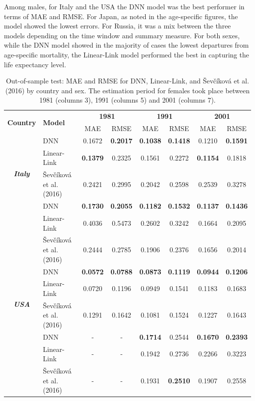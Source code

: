 \documentclass[a4,11pt]{article}
\begin{document}
Among males, for Italy and the USA the DNN model was the best performer in terms of MAE and RMSE. For Japan, as noted in the age-specific figures, the \citet{Sevcikova} model showed the lowest errors. For Russia, it was a mix between the three models depending on the time window and summary measure. For both sexes, while the DNN model showed in the majority of cases the lowest departures from age-specific mortality, the Linear-Link model performed the best in capturing the life expectancy level.


\begin{table}[H]
		\centering
		\caption{Out-of-sample test: MAE and RMSE for DNN, Linear-Link, and \v{S}ev\v{c}\'{i}kov\'{a} et al. (2016) by country and sex. The estimation period for females took place between 1981 (columns 3), 1991 (columns 5) and 2001 (columns 7).}
		\label{tab:1}
			\footnotesize	
		\begin{tabular}{cl|cc|cc|cc}
			\hline 		
			\multirow{2}{*}{\textbf{Country}} & \multirow{2}{*}{\textbf{Model}} & \multicolumn{2}{c|}{\textbf{1981\textendash 1995}} & \multicolumn{2}{c|}{\textbf{1991\textendash 2005}} & \multicolumn{2}{c}{\textbf{2001\textendash 2015}}\tabularnewline
			\cline{3-8} 
			& & MAE & RMSE & MAE & RMSE & MAE & RMSE\tabularnewline
			\hline 
			\multirow{4}{*}{\textbf{\textit{Italy}}} & \multirow{1}{*}{DNN} &0.1672& \textbf{0.2017}&\textbf{0.1038}& \textbf{0.1418}&0.1210& \textbf{0.1591} \tabularnewline
			& \multirow{1}{*}{Linear-Link} &\textbf{0.1379}& 0.2325& 0.1561 &0.2272&\textbf{0.1154}& 0.1818 \tabularnewline
      & \multirow{1}{*}{\v{S}ev\v{c}\'{i}kov\'{a} et al. (2016)} &0.2421&0.2995& 0.2042 &0.2598& 0.2539& 0.3278 \tabularnewline
      \hline 
			\multirow{4}{*}{\textbf{\textit{Japan}}} & \multirow{1}{*}{DNN} &\textbf{0.1730}& \textbf{0.2055}& \textbf{0.1182}& \textbf{0.1532}&\textbf{0.1137}&\textbf{ 0.1436}\tabularnewline
			& \multirow{1}{*}{Linear-Link} &0.4036& 0.5473& 0.2602& 0.3242&0.1664& 0.2095 \tabularnewline
      & \multirow{1}{*}{\v{S}ev\v{c}\'{i}kov\'{a} et al. (2016)}&0.2444& 0.2785 & 0.1906& 0.2376&0.1656& 0.2014 \tabularnewline
      \hline 
\multirow{4}{*}{\textbf{\textit{USA}}} &\multirow{1}{*}{DNN} &\textbf{0.0572}&\textbf{ 0.0788}&\textbf{ 0.0873}& \textbf{0.1119}&\textbf{0.0944}& \textbf{0.1206} \tabularnewline
			& \multirow{1}{*}{Linear-Link} &0.0720 &0.1196& 0.0949 &0.1541&0.1183& 0.1683 \tabularnewline
 	 		&\multirow{1}{*}{\v{S}ev\v{c}\'{i}kov\'{a} et al. (2016)} &0.1291 &0.1642& 0.1081 &0.1524&0.1227& 0.1643\tabularnewline
      \hline 
\multirow{4}{*}{\textbf{\textit{Russia (2014)}}} &\multirow{1}{*}{DNN} &-&-&\textbf{0.1714}&0.2544&\textbf{0.1670}& \textbf{0.2393}\tabularnewline
			& \multirow{1}{*}{Linear-Link} &-&-& 0.1942& 0.2736&0.2266& 0.3223 \tabularnewline
 	 		&\multirow{1}{*}{\v{S}ev\v{c}\'{i}kov\'{a} et al. (2016)}&-&-& 0.1931& \textbf{0.2510}&0.1907& 0.2558 \tabularnewline
 	 		\hline 
		\end{tabular}
	\end{table}
%
\end{document}
